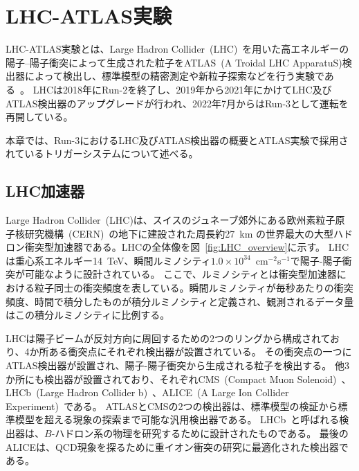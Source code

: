 \chapter{LHC-ATLAS実験}\label{chapter2}

LHC-ATLAS実験とは、Large Hadron Collider~(LHC)~\cite{article:LHC}を用いた高エネルギーの陽子–陽子衝突によって生成された粒子をATLAS~(A Troidal LHC ApparatuS)検出器によって検出し、標準模型の精密測定や新粒子探索などを行う実験である~\cite{Aad:1129811}。
LHCは2018年にRun-2を終了し、2019年から2021年にかけてLHC及びATLAS検出器のアップグレードが行われ、2022年7月からはRun-3として運転を再開している。

本章では、Run-3におけるLHC及びATLAS検出器の概要とATLAS実験で採用されているトリガーシステムについて述べる。

\section{LHC加速器}
\label{section2-1}
Large Hadron Collider~(LHC)は、スイスのジュネーブ郊外にある欧州素粒子原子核研究機構~(CERN)~\cite{article:CERN}の地下に建設された周長約27~km の世界最大の大型ハドロン衝突型加速器である。LHCの全体像を図~\ref{fig:LHC_overview}に示す。
LHCは重心系エネルギー14~TeV、瞬間ルミノシティ$1.0\times10^{34}$~cm$^{-2}$s$^{-1}$で陽子-陽子衝突が可能なように設計されている。
ここで、ルミノシティとは衝突型加速器における粒子同士の衝突頻度を表している。瞬間ルミノシティが毎秒あたりの衝突頻度、時間で積分したものが積分ルミノシティと定義され、観測されるデータ量はこの積分ルミノシティに比例する。

LHCは陽子ビームが反対方向に周回するための2つのリングから構成されており、4か所ある衝突点にそれぞれ検出器が設置されている。
その衝突点の一つにATLAS検出器が設置され、陽子-陽子衝突から生成される粒子を検出する。
他3か所にも検出器が設置されており、それぞれCMS~(Compact Muon Solenoid)~\cite{article:CMSExperiment}、LHCb~(Large Hadron Collider b)~\cite{article:LHCbExperiment}、ALICE~(A Large Ion Collider Experiment)~\cite{article:ALICEExperiment}である。
ATLASとCMSの2つの検出器は、標準模型の検証から標準模型を超える現象の探索まで可能な汎用検出器である。
LHCb~と呼ばれる検出器は、$B$-ハドロン系の物理を研究するために設計されたものである。
最後のALICEは、QCD現象を探るために重イオン衝突の研究に最適化された検出器である。


